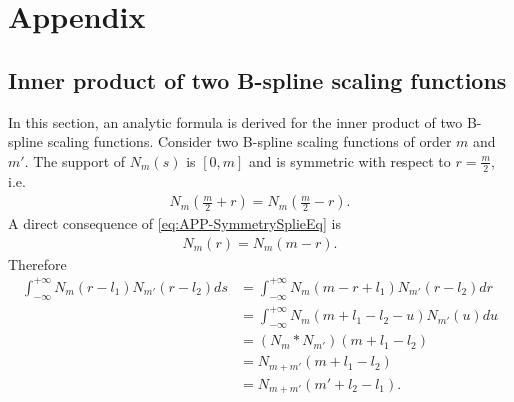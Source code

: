 \documentclass[review,authoryear,3p]{elsarticle}
\begin{document}
\section{Appendix}
\subsection{Inner product of two B-spline scaling functions}\label{ap:InnerProductOfBsplines}
In this section, an analytic formula is derived for the inner product of two B-spline scaling functions. Consider two B-spline scaling functions of order $m$ and $m'$. The support of $N_m\left(s\right)$ is $\left[ 0,m\right]$ and  is symmetric with respect to $r=\frac{m}{2}$, i.e.
\begin{align}\label{eq:APP-SymmetrySplieEq}
 N_{m}\left(\frac{m}{2}+r\right)=N_{m}\left(\frac{m}{2}-r\right).
\end{align}
A direct consequence of \eqref{eq:APP-SymmetrySplieEq} is 
\begin{align}
 N_{m}\left(r\right)=N_{m}\left(m-r\right).
\end{align}
Therefore
\begin{align}
\int_{-\infty}^{+\infty}N_{m}\left(r-l_{1}\right)N_{m'}\left(r-l_{2}\right)ds&=\int_{-\infty}^{+\infty}N_{m}\left(m-r+l_{1}\right)N_{m'}\left(r-l_{2}\right)dr \nonumber \\
&=\int_{-\infty}^{+\infty}N_{m}\left(m+l_{1}-l_{2}-u\right)N_{m'}\left(u\right)du \nonumber \\
&=\left(N_m \ast N_{m'}\right) \left(m+l_{1}-l_{2}\right) \nonumber \\
&=N_{m+m'}\left(m+l_{1}-l_{2}\right) \nonumber \\
&=N_{m+m'}\left(m'+l_{2}-l_{1}\right).
\end{align}
\end{document}
